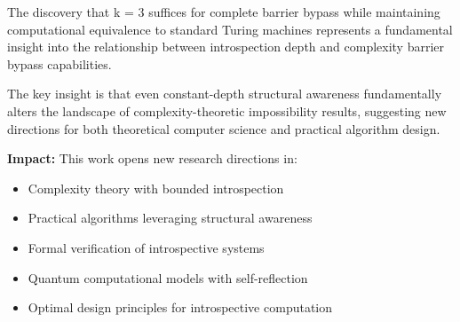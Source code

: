 \documentclass[11pt]{article}
\theoremstyle{definition}
\begin{document}
The discovery that k = 3 suffices for complete barrier bypass while maintaining computational equivalence to standard Turing machines represents a fundamental insight into the relationship between introspection depth and complexity barrier bypass capabilities.

The key insight is that even constant-depth structural awareness fundamentally alters the landscape of complexity-theoretic impossibility results, suggesting new directions for both theoretical computer science and practical algorithm design.

\textbf{Impact:} This work opens new research directions in:
\begin{itemize}
\item Complexity theory with bounded introspection
\item Practical algorithms leveraging structural awareness
\item Formal verification of introspective systems
\item Quantum computational models with self-reflection
\item Optimal design principles for introspective computation
\end{itemize}
\end{document}
